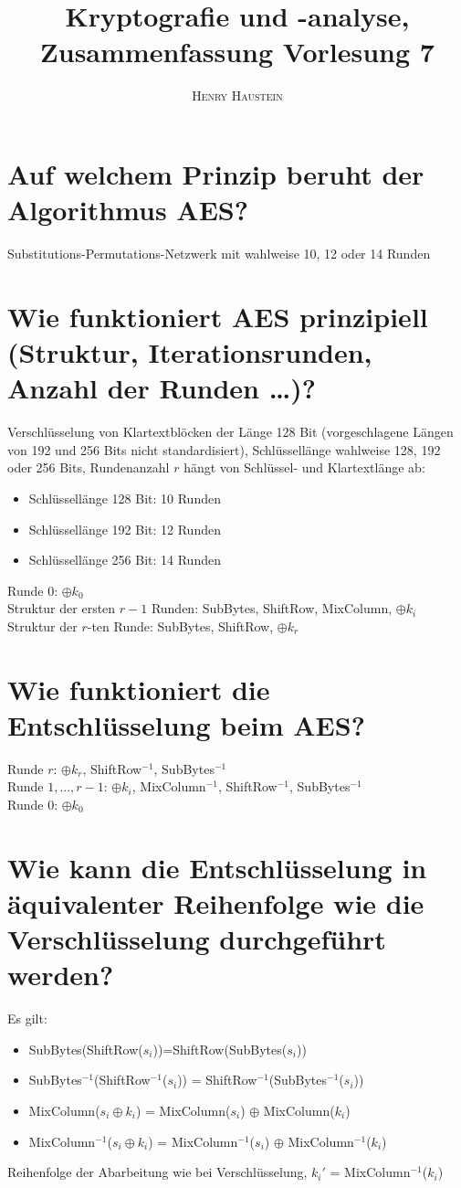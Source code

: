 \documentclass{article}
\title{\textbf{Kryptografie und -analyse, Zusammenfassung Vorlesung 7}}
\author{\textsc{Henry Haustein}}
\date{}
\begin{document}
	\maketitle
	
	\section*{Auf welchem Prinzip beruht der Algorithmus AES?}
	Substitutions-Permutations-Netzwerk mit wahlweise 10, 12 oder 14 Runden

	\section*{Wie funktioniert AES prinzipiell (Struktur, Iterationsrunden, Anzahl der Runden …)?}
	Verschlüsselung von Klartextblöcken der Länge 128 Bit (vorgeschlagene Längen von 192 und 256 Bits nicht standardisiert), Schlüssellänge wahlweise 128, 192 oder 256 Bits, Rundenanzahl $r$ hängt von Schlüssel- und Klartextlänge ab:
	\begin{itemize}
		\item Schlüssellänge 128 Bit: 10 Runden
		\item Schlüssellänge 192 Bit: 12 Runden
		\item Schlüssellänge 256 Bit: 14 Runden
	\end{itemize}

	Runde 0: $\oplus k_0$ \\
	Struktur der ersten $r-1$ Runden: SubBytes, ShiftRow, MixColumn, $\oplus k_i$ \\
	Struktur der $r$-ten Runde: SubBytes, ShiftRow, $\oplus k_r$
	
	\section*{Wie funktioniert die Entschlüsselung beim AES?}
	Runde $r$: $\oplus k_r$, ShiftRow$^{-1}$, SubBytes$^{-1}$ \\
	Runde $1,...,r-1$: $\oplus k_i$, MixColumn$^{-1}$, ShiftRow$^{-1}$, SubBytes$^{-1}$ \\
	Runde 0: $\oplus k_0$
	
	\section*{Wie kann die Entschlüsselung in äquivalenter Reihenfolge wie die Verschlüsselung durchgeführt werden?}
	Es gilt:
	\begin{itemize}
		\item SubBytes(ShiftRow($s_i$))=ShiftRow(SubBytes($s_i$))
		\item SubBytes$^{-1}$(ShiftRow$^{-1}$($s_i$)) = ShiftRow$^{-1}$(SubBytes$^{-1}$($s_i$))
		\item MixColumn($s_i \oplus k_i$) = MixColumn($s_i$) $\oplus$ MixColumn($k_i$)
		\item MixColumn$^{-1}$($s_i \oplus k_i$) = MixColumn$^{-1}$($s_i$) $\oplus$ MixColumn$^{-1}$($k_i$)
	\end{itemize}
	Reihenfolge der Abarbeitung wie bei Verschlüsselung, $k_i'$ = MixColumn$^{-1}$($k_i$)
	
\end{document}
